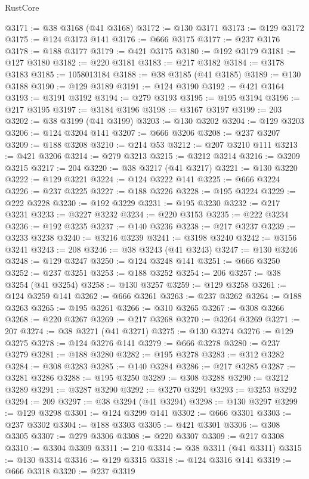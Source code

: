 \begin{lexlean}{RustCore}
\begin{coremodule}
@3171 := @38 @3168 (@41 @3168)
@3172 := @130 @3171
@3173 := @129 @3172
@3175 := @124 @3173 @141
@3176 := @666 @3175
@3177 := @237 @3176
@3178 := @188 @3177
@3179 := @421 @3175
@3180 := @192 @3179
@3181 := @127 @3180
@3182 := @220 @3181
@3183 := @217 @3182
@3184 := @3178 @3183
@3185 := 1058013184
@3188 := @38 @3185 (@41 @3185)
@3189 := @130 @3188
@3190 := @129 @3189
@3191 := @124 @3190
@3192 := @421 @3164
@3193 := @3191 @3192
@3194 := @279 @3193
@3195 := @195 @3194
@3196 := @217 @3195
@3197 := @3184 @3196
@3198 := @3167 @3197
@3199 := 203
@3202 := @38 @3199 (@41 @3199)
@3203 := @130 @3202
@3204 := @129 @3203
@3206 := @124 @3204 @141
@3207 := @666 @3206
@3208 := @237 @3207
@3209 := @188 @3208
@3210 := @214 @53
@3212 := @207 @3210 @111
@3213 := @421 @3206
@3214 := @279 @3213
@3215 := @3212 @3214
@3216 := @3209 @3215
@3217 := 204
@3220 := @38 @3217 (@41 @3217)
@3221 := @130 @3220
@3222 := @129 @3221
@3224 := @124 @3222 @141
@3225 := @666 @3224
@3226 := @237 @3225
@3227 := @188 @3226
@3228 := @195 @3224
@3229 := @222 @3228
@3230 := @192 @3229
@3231 := @195 @3230
@3232 := @217 @3231
@3233 := @3227 @3232
@3234 := @220 @3153
@3235 := @222 @3234
@3236 := @192 @3235
@3237 := @140 @3236
@3238 := @217 @3237
@3239 := @3233 @3238
@3240 := @3216 @3239
@3241 := @3198 @3240
@3242 := @3156 @3241
@3243 := 208
@3246 := @38 @3243 (@41 @3243)
@3247 := @130 @3246
@3248 := @129 @3247
@3250 := @124 @3248 @141
@3251 := @666 @3250
@3252 := @237 @3251
@3253 := @188 @3252
@3254 := 206
@3257 := @38 @3254 (@41 @3254)
@3258 := @130 @3257
@3259 := @129 @3258
@3261 := @124 @3259 @141
@3262 := @666 @3261
@3263 := @237 @3262
@3264 := @188 @3263
@3265 := @195 @3261
@3266 := @310 @3265
@3267 := @308 @3266
@3268 := @220 @3267
@3269 := @217 @3268
@3270 := @3264 @3269
@3271 := 207
@3274 := @38 @3271 (@41 @3271)
@3275 := @130 @3274
@3276 := @129 @3275
@3278 := @124 @3276 @141
@3279 := @666 @3278
@3280 := @237 @3279
@3281 := @188 @3280
@3282 := @195 @3278
@3283 := @312 @3282
@3284 := @308 @3283
@3285 := @140 @3284
@3286 := @217 @3285
@3287 := @3281 @3286
@3288 := @195 @3250
@3289 := @308 @3288
@3290 := @3212 @3289
@3291 := @3287 @3290
@3292 := @3270 @3291
@3293 := @3253 @3292
@3294 := 209
@3297 := @38 @3294 (@41 @3294)
@3298 := @130 @3297
@3299 := @129 @3298
@3301 := @124 @3299 @141
@3302 := @666 @3301
@3303 := @237 @3302
@3304 := @188 @3303
@3305 := @421 @3301
@3306 := @308 @3305
@3307 := @279 @3306
@3308 := @220 @3307
@3309 := @217 @3308
@3310 := @3304 @3309
@3311 := 210
@3314 := @38 @3311 (@41 @3311)
@3315 := @130 @3314
@3316 := @129 @3315
@3318 := @124 @3316 @141
@3319 := @666 @3318
@3320 := @237 @3319

\end{coremodule}
\end{lexlean}
